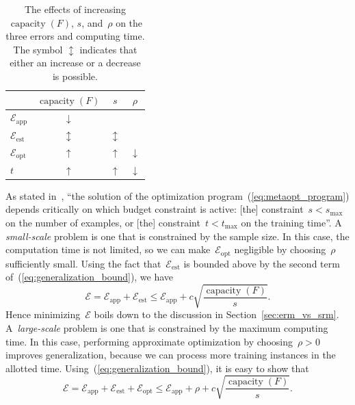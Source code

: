 \documentclass[11pt,a4paper]{article}
\numberwithin{equation}{section}
\newcommand{\capacity}{\operatorname{capacity}}
\newcommand{\apperr}{\mathcal{E}_{\mathrm{app}}}
\newcommand{\esterr}{\mathcal{E}_{\mathrm{est}}}
\newcommand{\opterr}{\mathcal{E}_{\mathrm{opt}}}
\begin{document}
\begin{table}
\centering
\begin{tabular}{lccc}
\toprule
& $\capacity(F)$ & $s$ & $\rho$ \\
\midrule
$\apperr$ & $\downarrow$ & \text{---} & \text{---} \\
$\esterr$ & $\updownarrow$ & $\updownarrow$ & \text{---} \\
$\opterr$ & $\uparrow$ & $\uparrow$ & $\downarrow$ \\
$t$ & $\uparrow$ & $\uparrow$ & $\downarrow$ \\
\bottomrule
\end{tabular}
\caption{The effects of increasing $\capacity(F)$, $s$, and~$\rho$ on the three
errors and computing time. The symbol $\updownarrow$ indicates that either an
increase or a decrease is possible.\label{tab:metaopt_variables}}
\end{table}

As stated in~\citet{bousquet2008tradeoffs}, ``the solution of the optimization
program~(\ref{eq:metaopt_program}) depends critically on which budget constraint
is active: [the] constraint~$s < s_{\text{max}}$ on the number of examples, or
[the] constraint~$t < t_{\text{max}}$ on the training time''. A
\emph{small-scale} problem is one that is constrained by the sample size. In
this case, the computation time is not limited, so we can make~$\opterr$
negligible by choosing~$\rho$ sufficiently small. Using the fact that~$\esterr$
is bounded above by the second term of~(\ref{eq:generalization_bound}), we have
\begin{equation}
	\mathcal{E} = \apperr + \esterr \leq \apperr + c
		\sqrt{\frac{\capacity(F)}{s}}.
	\label{eq:small_scale_bound}
\end{equation}
Hence minimizing~$\mathcal{E}$ boils down to the discussion in
Section~\ref{sec:erm_vs_srm}. A~\emph{large-scale} problem is one that is
constrained by the maximum computing time. In this case, performing approximate
optimization by choosing~$\rho > 0$ improves generalization, because we can
process more training instances in the allotted time.
Using~(\ref{eq:generalization_bound}), it is easy to show that
\begin{equation}
	\mathcal{E}
	= \apperr + \esterr + \opterr
	\leq \apperr + \rho + c\sqrt{\frac{\capacity(F)}{s}}.
	\label{eq:large_scale_bound}
\end{equation}
\end{document}
